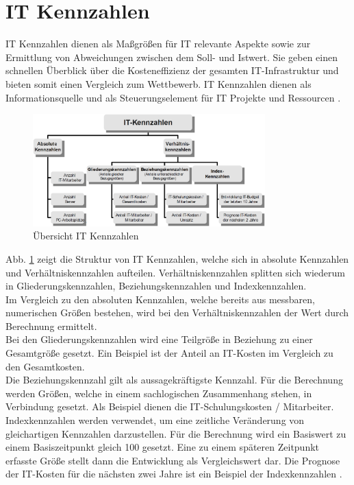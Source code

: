 \section{IT Kennzahlen}

IT Kennzahlen dienen als Maßgrößen für IT relevante Aspekte sowie zur Ermittlung von Abweichungen zwischen dem Soll- und Istwert. Sie geben einen schnellen Überblick über die Kosteneffizienz der gesamten IT-Infrastruktur und bieten somit einen Vergleich zum Wettbewerb. IT Kennzahlen dienen als Informationsquelle und als Steuerungselement für IT Projekte und Ressourcen \cite{Gadatsch10}. 

\begin{figure}[h!]
	\centering
	\includegraphics[width=0.8\textwidth]{BilderAllgemein/it_kennzahlen.PNG}
	\caption{Übersicht IT Kennzahlen \cite{Gadatsch10}}
	\label{img:uebersicht_it_kennzahlen}
\end{figure}

Abb. \ref{img:uebersicht_it_kennzahlen} zeigt die Struktur von IT Kennzahlen, welche sich in absolute Kennzahlen und Verhältniskennzahlen aufteilen. Verhältniskennzahlen splitten sich wiederum in Gliederungskennzahlen, Beziehungskennzahlen und Indexkennzahlen. \\
Im Vergleich zu den absoluten Kennzahlen, welche bereits aus messbaren, numerischen Größen bestehen, wird bei den Verhältniskennzahlen der Wert durch Berechnung ermittelt. \\
Bei den Gliederungskennzahlen wird eine Teilgröße in Beziehung zu einer Gesamtgröße gesetzt. Ein Beispiel ist der Anteil an IT-Kosten im Vergleich zu den Gesamtkosten. \\
Die Beziehungskennzahl gilt als aussagekräftigste Kennzahl. Für die Berechnung werden Größen, welche in einem sachlogischen Zusammenhang stehen, in Verbindung gesetzt. Als Beispiel dienen die IT-Schulungskosten / Mitarbeiter. \\
Indexkennzahlen werden verwendet, um eine zeitliche Veränderung von gleichartigen Kennzahlen darzustellen. Für die Berechnung wird ein Basiswert zu einem Basiszeitpunkt gleich 100 gesetzt. Eine zu einem späteren Zeitpunkt erfasste Größe stellt dann die Entwicklung als Vergleichswert dar. Die Prognose der IT-Kosten für die nächsten zwei Jahre ist ein Beispiel der Indexkennzahlen \cite{Gadatsch10} \cite{Jung07}.

